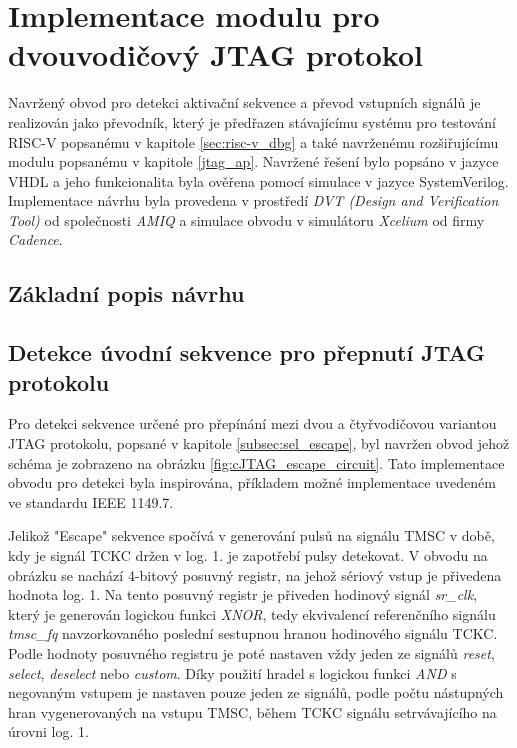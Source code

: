 \section{Implementace modulu pro dvouvodičový JTAG protokol}
Navržený obvod pro detekci aktivační sekvence a převod vstupních signálů je realizován jako převodník, který je předřazen stávajícímu systému pro testování \acs{RISC-V} popsanému v kapitole \ref{sec:risc-v_dbg} a také navrženému rozšiřujícímu modulu popsanému v kapitole \ref{jtag_ap}. Navržené řešení bylo popsáno v jazyce \acs{VHDL} a jeho funkcionalita byla ověřena pomocí simulace v jazyce SystemVerilog. Implementace návrhu byla provedena v prostředí \textit{DVT (Design and Verification Tool)} od společnosti \textit{AMIQ} a simulace obvodu v simulátoru \textit{Xcelium} od firmy \textit{Cadence}.

\subsection{Základní popis návrhu}	\label{subsec:cJTAG_adapter}


\subsection{Detekce úvodní sekvence pro přepnutí JTAG protokolu}	\label{subsec:sel_escape_det}
Pro detekci sekvence určené pro přepínání mezi dvou a čtyřvodičovou variantou \acs{JTAG} protokolu, popsané v kapitole \ref{subsec:sel_escape}, byl navržen obvod jehož schéma je zobrazeno na obrázku \ref{fig:cJTAG_escape_circuit}. Tato implementace obvodu pro detekci byla inspirována, příkladem možné implementace uvedeném ve standardu IEEE 1149.7.

Jelikož "Escape" sekvence spočívá v generování pulsů na signálu TMSC v době, kdy je signál TCKC držen v log. 1. je zapotřebí pulsy detekovat. V obvodu na obrázku se nachází 4-bitový posuvný registr, na jehož sériový vstup je přivedena hodnota log. 1. Na tento posuvný registr je přiveden hodinový signál \textit{sr\_clk}, který je generován logickou funkci \textit{XNOR}, tedy ekvivalencí referenčního signálu \textit{tmsc\_fq} navzorkovaného poslední sestupnou hranou hodinového signálu TCKC. Podle hodnoty posuvného registru je poté nastaven vždy jeden ze signálů \textit{reset}, \textit{select}, \textit{deselect} nebo \textit{custom}. Díky použití hradel s logickou funkci \textit{AND} s negovaným vstupem je nastaven pouze jeden ze signálů, podle počtu nástupných hran vygenerovaných na vstupu TMSC, během TCKC signálu setrvávajícího na úrovni log. 1. 

